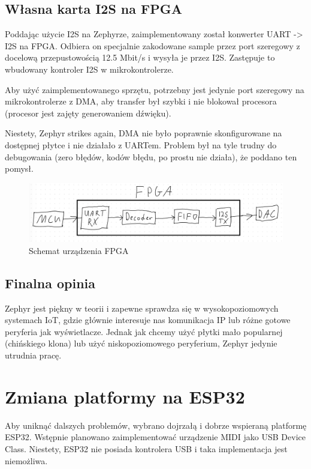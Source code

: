 \documentclass[12pt,a4paper,openright,dvipsnames]{mwart}
\begin{document}
\subsection{Własna karta I2S na FPGA}

Poddając użycie I2S na Zephyrze, zaimplementowany został
konwerter UART -> I2S na FPGA.
Odbiera on specjalnie zakodowane sample przez port szeregowy
z docelową przepustowością 12.5 Mbit/s
i wysyła je przez I2S.
Zastępuje to wbudowany kontroler I2S w mikrokontrolerze.

Aby użyć zaimplementowanego sprzętu, potrzebny jest
jedynie port szeregowy na mikrokontrolerze z DMA,
aby transfer był szybki i nie blokował procesora
(procesor jest zajęty generowaniem dźwięku).

Niestety, Zephyr strikes again, DMA nie było poprawnie skonfigurowane
na dostępnej płytce i nie działało z UARTem.
Problem był na tyle trudny do debugowania (zero błędów, kodów błędu, po prostu nie działa), że poddano ten pomysł.

\begin{figure}[h]
    \centering
    \includegraphics[width=\textwidth]{fpga}
    \caption{Schemat urządzenia FPGA}
\end{figure}

\subsection{Finalna opinia}

Zephyr jest piękny w teorii i zapewne sprawdza się
w wysokopoziomowych systemach IoT, gdzie głównie interesuje
nas komunikacja IP lub różne gotowe peryferia jak wyświetlacze.
Jednak jak chcemy użyć płytki mało popularnej (chińskiego klona)
lub użyć niskopoziomowego peryferium, Zephyr jedynie utrudnia pracę.


\section{Zmiana platformy na ESP32}

Aby uniknąć dalszych problemów, wybrano dojrzałą
i dobrze wspieraną platformę ESP32.
Wstępnie planowano zaimplementować urządzenie MIDI
jako USB Device Class. Niestety, ESP32 nie posiada
kontrolera USB i taka implementacja jest niemożliwa.
\end{document}
